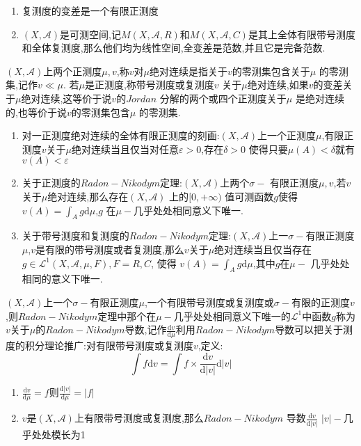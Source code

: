 \begin{enumerate}
  \item 复测度的变差是一个有限正测度
  \item $(X,\mathscr{A})$是可测空间,记$M(X,\mathscr{A},R)$和$M(X,\mathscr{A},C)$是其上全体有限带号测度和全体复测度,那么他们均为线性空间,全变差是范数,并且它是完备范数.
\end{enumerate}

$(X,\mathscr{A})$上两个正测度$\mu,v$,称$v$对$\mu$绝对连续是指关于$v$的零测集包含关于$\mu$ 的零测集,记作$v\ll\mu$. 若$\mu$是正测度,称带号测度或复测度$v$ 关于$\mu$绝对连续,如果$v$的变差关于$\mu$绝对连续,这等价于说$v$的$Jordan$ 分解的两个或四个正测度关于$\mu$ 是绝对连续的,也等价于说$v$的零测集包含$\mu$ 的零测集.

\begin{enumerate}
  \item 对一正测度绝对连续的全体有限正测度的刻画:$(X,\mathscr{A})$上一个正测度$\mu$,有限正测度$v$关于$\mu$绝对连续当且仅当对任意$\varepsilon>0$,存在$\delta>0$ 使得只要$\mu(A)<\delta$就有$v(A)<\varepsilon$
  \item 关于正测度的$Radon-Nikodym$定理:$(X,\mathscr{A})$上两个$\sigma-$ 有限正测度$\mu,v$,若$v$关于$\mu$绝对连续,那么存在$(X,\mathscr{A})$ 上的$[0,+\infty)$ 值可测函数$g$使得$v(A)=\int_A g\mathrm{d}\mu$,$g$ 在$\mu-$几乎处处相同意义下唯一.
  \item 关于带号测度和复测度的$Radon-Nikodym$定理:$(X,\mathscr{A})$上一$\sigma-$有限正测度$\mu$,$v$是有限的带号测度或者复测度,那么$v$关于$\mu$绝对连续当且仅当存在$g\in\mathscr{L} ^1(X,\mathscr{A},\mu,F),F=R,C$, 使得
      $v(A)=\int_A g\mathrm{d}\mu$,其中$g$在$\mu-$ 几乎处处相同的意义下唯一.
\end{enumerate}

$(X,\mathscr{A})$上一个$\sigma-$有限正测度$\mu$,一个有限带号测度或复测度或$\sigma-$有限的正测度$v$,则$Radon-Nikodym$定理中那个在$\mu-$几乎处处相同意义下唯一的$\mathscr{L}^1$中函数$g$称为$v$关于$\mu$的$Radon-Nikodym$导数,记作$\frac{\mathrm{d}v} {\mathrm{d}\mu}$利用$Radon-Nikodym$导数可以把关于测度的积分理论推广:对有限带号测度或复测度$v$,定义:
$$\int f\mathrm{d}v=\int f\times\frac{\mathrm{d}v}{\mathrm{d}|v|}\mathrm{d}|v|$$

\begin{enumerate}
  \item $\frac{\mathrm{d}v}{\mathrm{d}\mu}=f$则$\frac{\mathrm{d}|v|}{\mathrm{d}\mu}=|f|$
  \item $v$是$(X,\mathscr{A})$上有限带号测度或复测度,那么$Radon-Nikodym$ 导数$\frac{\mathrm{d}v}{\mathrm{d}|v|}$
  $|v|-$几乎处处模长为1
\end{enumerate}

